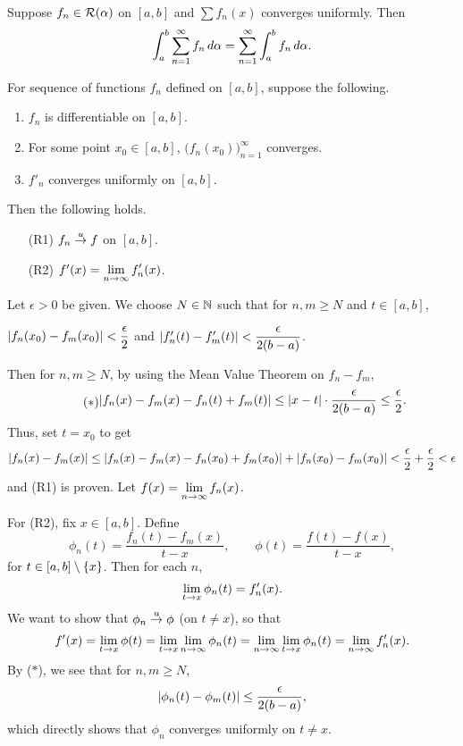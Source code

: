 \cor Suppose \(f_n \in \mathcal{R}(\alpha)\) on \([a, b]\) and \(\sum f_n(x)\) converges uniformly. Then
\[
    \int_a^b \sum_{n=1}^\infty f_n \,d{\alpha} = \sum_{n=1}^\infty \int_a^b f_n \,d{\alpha}.
\]

 For sequence of functions \(f_n\) defined on \([a, b]\), suppose the following.
\begin{enumerate}
    \item \(f_n\) is differentiable on \([a, b]\).
    \item For some point \(x_0 \in [a, b]\), \(\bigl(f_n(x_0)\bigr)_{n=1}^\infty\) converges.
    \item \(f'_n\) converges uniformly on \([a, b]\).
\end{enumerate}
Then the following holds.
\begin{enumerate}
    \item[(R1)] \(f_n \overset{u}{\rightarrow} f\) on \([a, b]\).
    \item[(R2)] \(f'(x) = \displaystyle \lim_{n \rightarrow \infty} f'_n(x)\).
\end{enumerate}

\pf Let \(\epsilon > 0\) be given. We choose \(N \in \mathbb{N}\) such that for \(n, m \geq N\) and \(t \in [a, b]\),
\begin{center}
    \(\left| f_n(x_0) - f_m(x_0) \right| < \dfrac{\epsilon}{2}\) and \(\left| f'_n(t) - f'_m(t) \right| < \dfrac{\epsilon}{2(b-a)}\).
\end{center}
Then for \(n, m \geq N\), by using the Mean Value Theorem on \(f_n - f_m\),
\begin{equation} \tag{\(\ast\)}
    \begin{aligned}
        \left| f_n(x) - f_m(x) - f_n(t) + f_m(t) \right| \leq \left| x - t \right| \cdot \frac{\epsilon}{2(b - a)} \leq \frac{\epsilon}{2}.
    \end{aligned}
\end{equation}
Thus, set \(t = x_0\) to get
\[
    \left| f_n(x) - f_m(x) \right| \leq \left| f_n(x) - f_m(x) - f_n(x_0) + f_m(x_0) \right| + \left| f_n(x_0) - f_m(x_0) \right| < \dfrac{\epsilon}{2} + \dfrac{\epsilon}{2} < \epsilon
\] and (R1) is proven. Let \(f(x) = \displaystyle \lim_{n \rightarrow \infty} f_n(x)\).

For (R2), fix \(x \in [a, b]\). Define
\[
    \phi_n(t) = \frac{f_n(t) - f_m(x)}{t - x}, \qquad \phi(t) = \frac{f(t) - f(x)}{t - x},
\]
for \(t \in [a, b] \setminus \{x\}\). Then for each \(n\),
\[
    \lim_{t \rightarrow x} \phi_n(t) = f'_n(x).
\]
We want to show that \(\phi_n \overset{u}{\rightarrow} \phi\) (on \(t \neq x\)), so that
\[
    f'(x) = \lim_{t \rightarrow x} \phi(t) = \lim_{t \rightarrow x} \lim_{n \rightarrow\infty}\phi_n (t) = \lim_{n \rightarrow\infty} \lim_{t \rightarrow x} \phi_n(t) = \lim_{n\rightarrow\infty} f'_n(x).
\]
By (\(\ast\)), we see that for \(n, m \geq N\),
\[
    \left| \phi_n(t) - \phi_m(t) \right| \leq \frac{\epsilon}{2(b-a)},
\]
which directly shows that \(\phi_n\) converges uniformly on \(t \neq x\).

